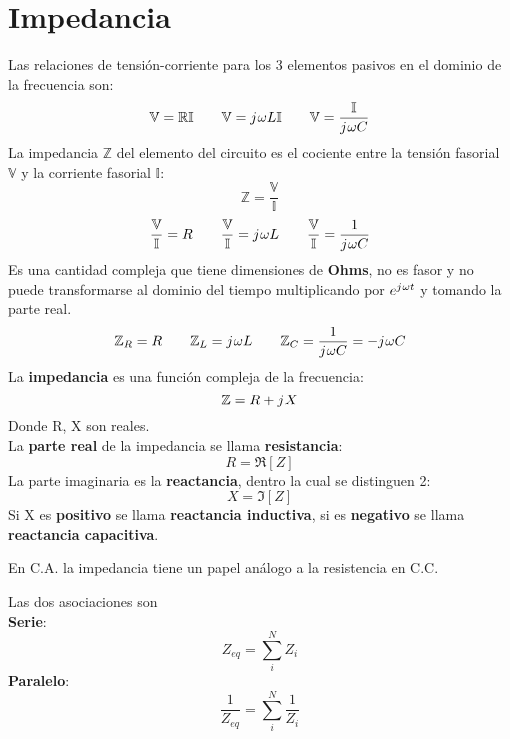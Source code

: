 \documentclass[
	12pt, %
	fleqn, %
	a4paper, %
	oneside, %
]{LegrandOrangeBook}
\begin{document}
\section{Impedancia}\label{sec:Impedancia}
Las relaciones de tensión-corriente para los 3 elementos pasivos en el dominio de la frecuencia son:
\begin{equation*}
\mathbb{V}=\mathbb{R}\mathbb{I}
\qquad
\mathbb{V}={j\mkern1mu}\omega L\mathbb{I}
\qquad
\mathbb{V}=\frac{\mathbb{I}}{{j\mkern1mu}\omega C}
\end{equation*}
La impedancia $\mathbb{Z}$ del elemento del circuito es el cociente entre la tensión fasorial $\mathbb{V}$ y la corriente fasorial $\mathbb{I}$:
\begin{displaymath}
\mathbb{Z}=\frac{\mathbb{V}}{\mathbb{I}}
\end{displaymath}
\begin{equation*}
\frac{\mathbb{V}}{\mathbb{I}}=R
\qquad
\frac{\mathbb{V}}{\mathbb{I}}={j\mkern1mu}\omega L
\qquad
\frac{\mathbb{V}}{\mathbb{I}}=\frac{1}{{j\mkern1mu}\omega C}
\end{equation*}
Es una cantidad compleja que tiene dimensiones de \textbf{Ohms}, no es fasor y no puede transformarse al dominio del tiempo multiplicando por $e^{{j\mkern1mu}\omega t}$ y tomando la parte real.
\begin{equation*}
\mathbb{Z}_R=R
\qquad
\mathbb{Z}_L={j\mkern1mu}\omega L
\qquad
\mathbb{Z}_C=\frac{1}{{j\mkern1mu}\omega C}=-{j\mkern1mu}\omega C
\end{equation*}
La \textbf{impedancia} es una función compleja de la frecuencia:
\begin{displaymath}
\mathbb{Z}=R+{j\mkern1mu} X
\end{displaymath}
Donde R, X son reales.\\
La \textbf{parte real} de la impedancia se llama \textbf{resistancia}:
\begin{displaymath}
R=\Re[Z]
\end{displaymath}
La parte imaginaria es la \textbf{reactancia}, dentro la cual se distinguen 2:
\begin{displaymath}
X=\Im[Z]
\end{displaymath}
Si X es \textbf{positivo} se llama \textbf{reactancia inductiva}, si es \textbf{negativo} se llama \textbf{reactancia capacitiva}.
\begin{remark}
En C.A. la impedancia tiene un papel análogo a la resistencia en C.C.
\end{remark}
\begin{definition}
Las dos asociaciones son\\
\textbf{Serie}:
\begin{equation}
Z_{eq}=\sum_i^N Z_i
\end{equation}
\textbf{Paralelo}:
\begin{equation}
\frac{1}{Z_{eq}}=\sum_i^N\frac{1}{Z_i}
\end{equation}
\end{definition}
\end{document}

